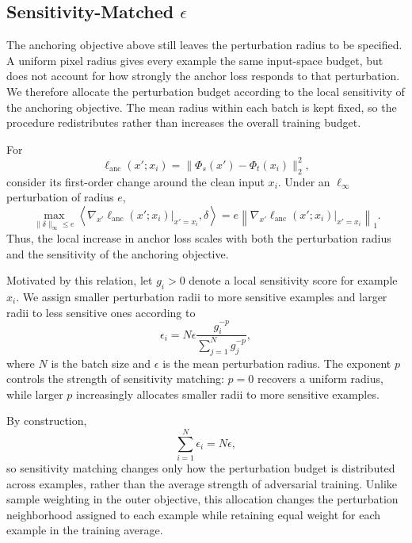 \documentclass{article} %
\theoremstyle{plain}
\begin{document}
\subsection{Sensitivity-Matched \(\epsilon\)}
\label{sec:angeps}

The anchoring objective above still leaves the perturbation radius to be
specified. A uniform pixel radius gives every example the same input-space
budget, but does not account for how strongly the anchor loss responds to
that perturbation. We therefore allocate the perturbation budget according
to the local sensitivity of the anchoring objective. The mean radius within
each batch is kept fixed, so the procedure redistributes rather than
increases the overall training budget.

For
\[
\ell_{\mathrm{anc}}(x';x_i)
=
\lVert
\Phi_s(x')-\Phi_t(x_i)
\rVert_2^2,
\]
consider its first-order change around the clean input \(x_i\). Under an
\(\ell_\infty\) perturbation of radius \(e\),
\begin{equation}
\max_{\lVert\delta\rVert_\infty\le e}
\left\langle
\nabla_{x'}
\ell_{\mathrm{anc}}(x';x_i)\big|_{x'=x_i},
\delta
\right\rangle
=
e
\left\lVert
\nabla_{x'}
\ell_{\mathrm{anc}}(x';x_i)\big|_{x'=x_i}
\right\rVert_1.
\label{eqn:firstorder}
\end{equation}
Thus, the local increase in anchor loss scales with both the perturbation
radius and the sensitivity of the anchoring objective.

Motivated by this relation, let \(g_i>0\) denote a local sensitivity score
for example \(x_i\). We assign smaller perturbation radii to more sensitive
examples and larger radii to less sensitive ones according to
\begin{equation}
\epsilon_i
=
N\epsilon
\frac{g_i^{-p}}
{\sum_{j=1}^{N} g_j^{-p}},
\label{eqn:angeps_ideal}
\end{equation}
where \(N\) is the batch size and \(\epsilon\) is the mean perturbation
radius. The exponent \(p\) controls the strength of sensitivity matching:
\(p=0\) recovers a uniform radius, while larger \(p\) increasingly allocates
smaller radii to more sensitive examples.

By construction,
\[
\sum_{i=1}^{N}\epsilon_i=N\epsilon,
\]
so sensitivity matching changes only how the perturbation budget is
distributed across examples, rather than the average strength of adversarial
training. Unlike sample weighting in the outer objective, this allocation
changes the perturbation neighborhood assigned to each example while
retaining equal weight for each example in the training average.
\end{document}
